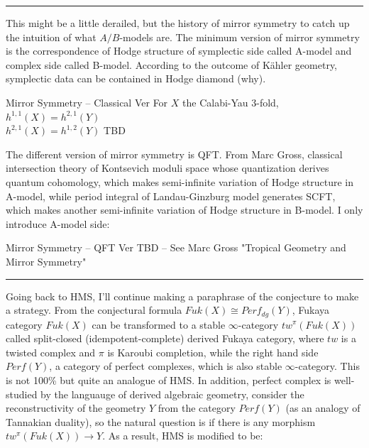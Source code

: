 \documentclass{article}
\begin{document}
\vspace{0.5cm}
\noindent\rule{\textwidth}{0.4pt}
\vspace{0.5cm}


\noindent
This might be a little derailed, but the history of mirror symmetry to catch up the intuition of what $A/B$-models are.
The minimum version of mirror symmetry is the correspondence of Hodge structure of symplectic side called A-model
and complex side called B-model. According to the outcome of K\"ahler geometry, symplectic data can be contained in Hodge diamond (why). \\


\begin{definition}{Mirror Symmetry -- Classical Ver}{}
For $X$ the Calabi-Yau 3-fold,\\
$h^{1,1}(X) = h^{2,1}(Y)$\\
$h^{2,1}(X) = h^{1,2}(Y)$
TBD
\end{definition}


\noindent
The different version of mirror symmetry is QFT.
From Marc Gross, classical intersection theory of Kontsevich moduli space whose quantization derives quantum cohomology,
which makes semi-infinite variation of Hodge structure in A-model, 
while period integral of Landau-Ginzburg model generates SCFT, which makes another semi-infinite variation of Hodge structure in B-model.
I only introduce A-model side: \\

\begin{definition}{Mirror Symmetry -- QFT Ver}{}
TBD -- See Marc Gross "Tropical Geometry and Mirror Symmetry"
\end{definition}



\vspace{0.5cm}
\noindent\rule{\textwidth}{0.4pt}
\vspace{0.5cm}


\noindent
Going back to HMS, I'll continue making a paraphrase of the conjecture to make a strategy.
From the conjectural formula $Fuk(X) \cong Perf_{dg}(Y)$, Fukaya category $Fuk(X)$ can be transformed to a stable $\infty$-category
$tw^\pi(Fuk(X))$ called split-closed (idempotent-complete) derived Fukaya category, 
where $tw$ is a twisted complex and $\pi$ is Karoubi completion,
while the right hand side $Perf(Y)$, a category of perfect complexes, which is also stable $\infty$-category.
This is not 100\% but quite an analogue of HMS. In addition, perfect complex is well-studied by the languauge of derived algebraic geometry,
consider the reconstructivity of the geometry $Y$ from the category $Perf(Y)$ (as an analogy of Tannakian duality),
so the natural question is if there is any morphism $tw^\pi(Fuk(X)) \to Y$.
As a result, HMS is modified to be: \\
\end{document}

